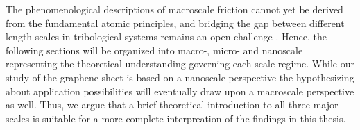 The phenomenological descriptions of macroscale friction cannot yet be derived from the fundamental atomic principles, and bridging the gap between different length scales in tribological systems remains an open challenge \cite{Manini_2016}. Hence, the following sections will be organized into macro-, micro- and nanoscale representing the theoretical understanding governing each scale regime. While our study of the graphene sheet is based on a nanoscale perspective the hypothesizing about application possibilities will eventually draw upon a macroscale perspective as well. Thus, we argue that a brief theoretical introduction to all three major scales is suitable for a more complete interpreation of the findings in this thesis. 









